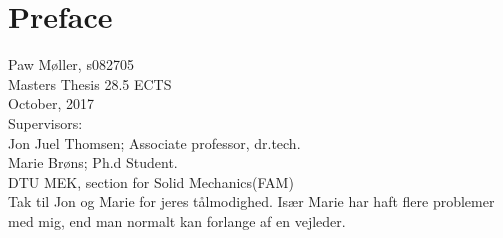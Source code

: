 
\section*{Preface}

{\parindent0pt
Paw Møller, s082705\\
Masters Thesis 28.5 ECTS\\
October, 2017\\
Supervisors:\\
Jon Juel Thomsen; Associate professor, dr.tech.\\
Marie Brøns; Ph.d Student.\\
DTU MEK, section for Solid Mechanics(FAM)\\

Tak til Jon og Marie for jeres tålmodighed. Især Marie har haft flere problemer
med mig, end man normalt kan forlange af en vejleder.
}
